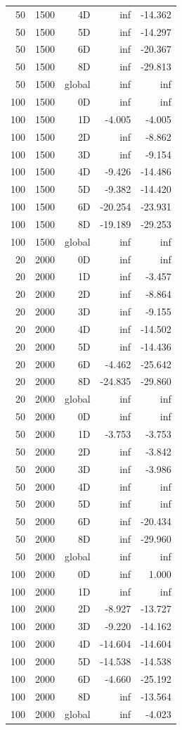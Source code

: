 \begin{longtable}{rrrrr}
50 & 1500 & 4D & inf & -14.362 \\
50 & 1500 & 5D & inf & -14.297 \\
50 & 1500 & 6D & inf & -20.367 \\
50 & 1500 & 8D & inf & -29.813 \\
50 & 1500 & global & inf & inf \\
100 & 1500 & 0D & inf & inf \\
100 & 1500 & 1D & -4.005 & -4.005 \\
100 & 1500 & 2D & inf & -8.862 \\
100 & 1500 & 3D & inf & -9.154 \\
100 & 1500 & 4D & -9.426 & -14.486 \\
100 & 1500 & 5D & -9.382 & -14.420 \\
100 & 1500 & 6D & -20.254 & -23.931 \\
100 & 1500 & 8D & -19.189 & -29.253 \\
100 & 1500 & global & inf & inf \\
20 & 2000 & 0D & inf & inf \\
20 & 2000 & 1D & inf & -3.457 \\
20 & 2000 & 2D & inf & -8.864 \\
20 & 2000 & 3D & inf & -9.155 \\
20 & 2000 & 4D & inf & -14.502 \\
20 & 2000 & 5D & inf & -14.436 \\
20 & 2000 & 6D & -4.462 & -25.642 \\
20 & 2000 & 8D & -24.835 & -29.860 \\
20 & 2000 & global & inf & inf \\
50 & 2000 & 0D & inf & inf \\
50 & 2000 & 1D & -3.753 & -3.753 \\
50 & 2000 & 2D & inf & -3.842 \\
50 & 2000 & 3D & inf & -3.986 \\
50 & 2000 & 4D & inf & inf \\
50 & 2000 & 5D & inf & inf \\
50 & 2000 & 6D & inf & -20.434 \\
50 & 2000 & 8D & inf & -29.960 \\
50 & 2000 & global & inf & inf \\
100 & 2000 & 0D & inf & 1.000 \\
100 & 2000 & 1D & inf & inf \\
100 & 2000 & 2D & -8.927 & -13.727 \\
100 & 2000 & 3D & -9.220 & -14.162 \\
100 & 2000 & 4D & -14.604 & -14.604 \\
100 & 2000 & 5D & -14.538 & -14.538 \\
100 & 2000 & 6D & -4.660 & -25.192 \\
100 & 2000 & 8D & inf & -13.564 \\
100 & 2000 & global & inf & -4.023 \\
\end{longtable}
